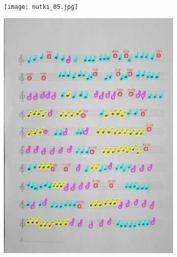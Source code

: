 \documentclass[11pt]{article}
\begin{document}
\begin{figure}[H]
    \centering
    \begin{subfigure}{.5\textwidth}
        \centering
        \graphicspath{ {Resources/} }
        \texttt{[image: nutki\_05.jpg]}
        \label{fig:sub1}
    \end{subfigure}%
    \begin{subfigure}{.5\textwidth}
        \centering
        \graphicspath{ {blobs/} }
        \includegraphics[width=\linewidth]{5_cnts.jpg}
        \label{fig:sub2}
    \end{subfigure}
    \label{fig:test}
\end{figure}
\end{document}
